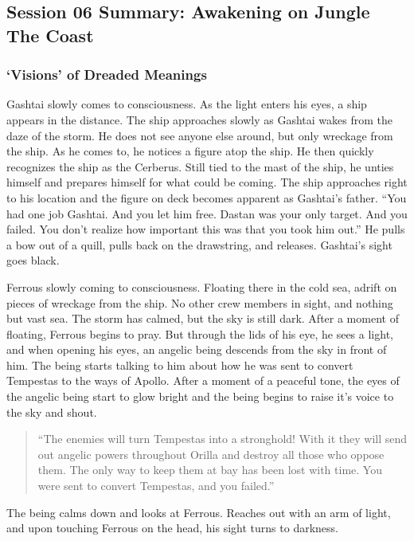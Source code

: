\subsection{Session 06 Summary: Awakening on Jungle The Coast}

\subsubsection{`Visions' of Dreaded Meanings}

Gashtai slowly comes to consciousness. As the light enters his eyes, a ship appears in the distance. The ship approaches slowly as Gashtai wakes from the daze of the storm. He does not see anyone else around, but only wreckage from the ship. As he comes to, he notices a figure atop the ship. He then quickly recognizes the ship as the Cerberus. Still tied to the mast of the ship, he unties himself and prepares himself for what could be coming. The ship approaches right to his location and the figure on deck becomes apparent as Gashtai's father. ``You had one job Gashtai. And you let him free. Dastan was your only target. And you failed. You don't realize how important this was that you took him out.'' He pulls a bow out of a quill, pulls back on the drawstring, and releases. Gashtai's sight goes black.

Ferrous slowly coming to consciousness. Floating there in the cold sea, adrift on pieces of wreckage from the ship. No other crew members in sight, and nothing but vast sea. The storm has calmed, but the sky is still dark.	After a moment of floating, Ferrous begins to pray. But through the lids of his eye, he sees a light, and when opening his eyes, an angelic being descends from the sky in front of him. The being starts talking to him about how he was sent to convert Tempestas to the ways of Apollo. After a moment of a peaceful tone, the eyes of the angelic being start to glow bright and the being begins to raise it's voice to the sky and shout.

\begin{quote}
	``The enemies will turn Tempestas into a stronghold! With it they will send out angelic powers throughout Orilla and destroy all those who oppose them. The only way to keep them at bay has been lost with time. You were sent to convert Tempestas, and you failed.''
\end{quote}

The being calms down and looks at Ferrous. Reaches out with an arm of light, and upon touching Ferrous on the head, his sight turns to darkness.

